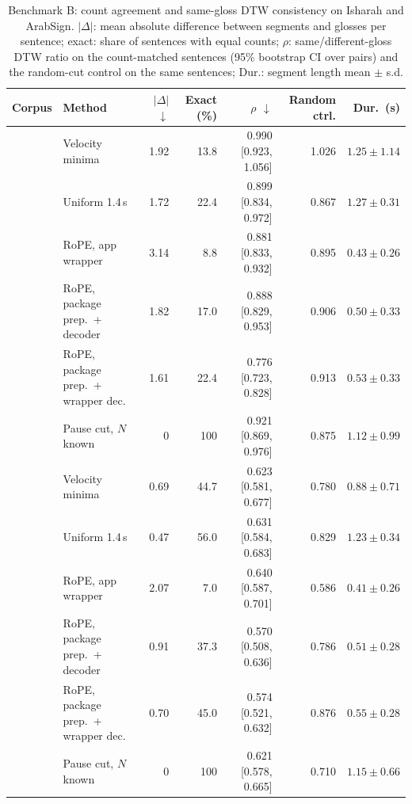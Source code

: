 \begin{table}[ht]
\centering\scriptsize
\caption{Benchmark B: count agreement and same-gloss DTW consistency on Isharah and ArabSign. $|\Delta|$: mean
absolute difference between segments and glosses per sentence; exact: share of sentences with equal counts;
$\rho$: same/different-gloss DTW ratio on the count-matched sentences (95\% bootstrap CI over pairs) and the
random-cut control on the same sentences; Dur.: segment length mean $\pm$ s.d.}
\label{tab:segmentation_real}
\setlength{\tabcolsep}{3pt}
\begin{tabularx}{\textwidth}{l Y r r r r r}
\toprule
\textbf{Corpus} & \textbf{Method} & $|\Delta|$ $\downarrow$ & \textbf{Exact (\%)} & $\rho$ $\downarrow$ & \textbf{Random ctrl.} & \textbf{Dur.\ (s)} \\
\midrule
{}
 & Velocity minima & 1.92 & 13.8 & 0.990 [0.923, 1.056] & 1.026 & $1.25 \pm 1.14$ \\
 & Uniform 1.4\,s & 1.72 & 22.4 & 0.899 [0.834, 0.972] & 0.867 & $1.27 \pm 0.31$ \\
 & RoPE, app wrapper & 3.14 & 8.8 & 0.881 [0.833, 0.932] & 0.895 & $0.43 \pm 0.26$ \\
 & RoPE, package prep.\ + decoder & 1.82 & 17.0 & 0.888 [0.829, 0.953] & 0.906 & $0.50 \pm 0.33$ \\
 & RoPE, package prep.\ + wrapper dec. & 1.61 & 22.4 & 0.776 [0.723, 0.828] & 0.913 & $0.53 \pm 0.33$ \\
 & Pause cut, $N$ known & 0 & 100 & 0.921 [0.869, 0.976] & 0.875 & $1.12 \pm 0.99$ \\
\midrule
{}
 & Velocity minima & 0.69 & 44.7 & 0.623 [0.581, 0.677] & 0.780 & $0.88 \pm 0.71$ \\
 & Uniform 1.4\,s & 0.47 & 56.0 & 0.631 [0.584, 0.683] & 0.829 & $1.23 \pm 0.34$ \\
 & RoPE, app wrapper & 2.07 & 7.0 & 0.640 [0.587, 0.701] & 0.586 & $0.41 \pm 0.26$ \\
 & RoPE, package prep.\ + decoder & 0.91 & 37.3 & 0.570 [0.508, 0.636] & 0.786 & $0.51 \pm 0.28$ \\
 & RoPE, package prep.\ + wrapper dec. & 0.70 & 45.0 & 0.574 [0.521, 0.632] & 0.876 & $0.55 \pm 0.28$ \\
 & Pause cut, $N$ known & 0 & 100 & 0.621 [0.578, 0.665] & 0.710 & $1.15 \pm 0.66$ \\
\bottomrule
\end{tabularx}
\end{table}

